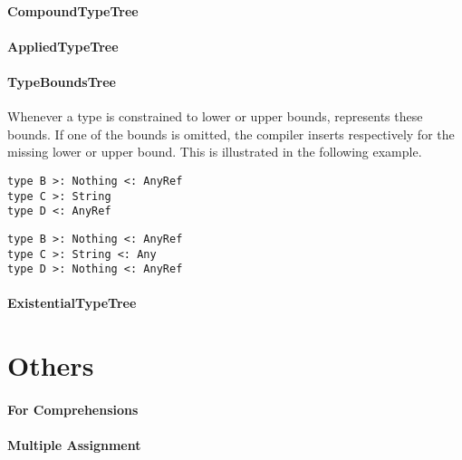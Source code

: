 \paragraph{CompoundTypeTree} 

\paragraph{AppliedTypeTree} 

\paragraph{TypeBoundsTree} 

\noindent Whenever a type is constrained to lower or upper bounds,  represents these bounds. If one of the bounds is omitted, the compiler inserts  respectively  for the missing lower or upper bound. This is illustrated in the following example.

\begin{multicols}{2}
\begin{lstlisting}
type B >: Nothing <: AnyRef
type C >: String
type D <: AnyRef
\end{lstlisting}
\begin{lstlisting}  
type B >: Nothing <: AnyRef
type C >: String <: Any
type D >: Nothing <: AnyRef
\end{lstlisting}
\end{multicols}


\paragraph{ExistentialTypeTree} 

\section{Others}

\paragraph{For Comprehensions}

\paragraph{Multiple Assignment}





